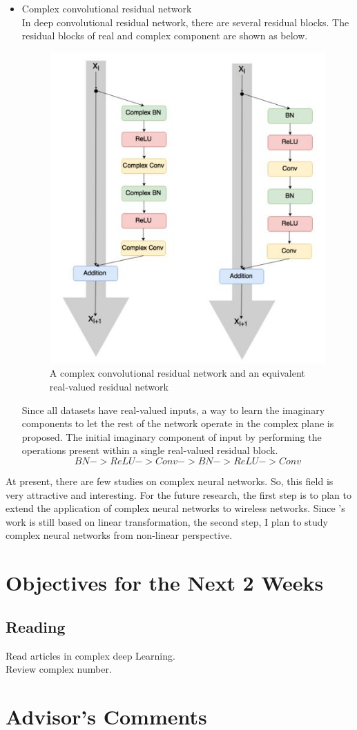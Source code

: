\documentclass[11pt]{report}
\begin{document}
	\begin{itemize}
		\item Complex convolutional residual network\\
		In deep convolutional residual network, there are several residual blocks. The residual blocks of real and complex component are shown as below.
		\begin{figure}[h!]
			\centering
			\includegraphics[width=0.4\linewidth]{residualnetwork.jpg}
			\caption{A complex convolutional residual network and an equivalent real-valued residual network}
			\label{}
		\end{figure}
		
		Since all datasets have real-valued inputs, a way to learn the imaginary components to let the rest of the network operate in the complex plane is proposed. The initial imaginary component of input by performing the operations present within a single real-valued residual block.
		\begin{equation*}
		BN -> ReLU -> Conv -> BN -> ReLU -> Conv
		\end{equation*}
	\end{itemize}
    
    At present, there are few studies on complex neural networks. So, this field is very attractive and interesting. For the future research, the first step is to plan to extend the application of complex neural networks to wireless networks. Since \cite{DBLP:journals/corr/TrabelsiBSSSMRB17}'s work is still  based on linear transformation, the second step, I plan to study complex neural networks from non-linear perspective.
    
	
	
	\section{Objectives for the Next 2 Weeks}
	\subsection{Reading} 
	Read articles in complex deep Learning.\\
	Review complex number.
	
	
	\section{Advisor's Comments}
	
	
	
	
\end{document}
